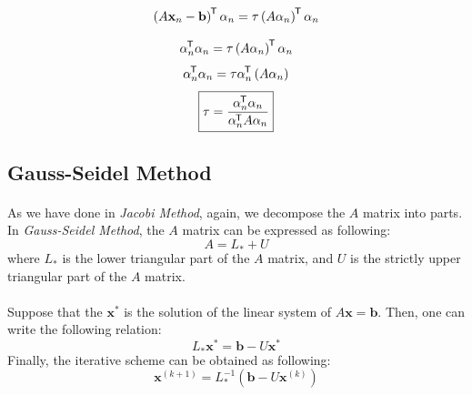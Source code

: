 \documentclass[letterpaper,12pt]{article}
\newcommand*{\tran}{^{\mkern-1.5mu\mathsf{T}}}
\begin{document}
\begin{equation*}
   \left( A \mathbf{x}_n - \mathbf{b} \right) \tran \mathbf{\alpha}_n = \tau \left( A \mathbf{\alpha}_n \right)\tran \mathbf{\alpha}_n 
\end{equation*}

\begin{equation*}
   \mathbf{\alpha}_n \tran \mathbf{\alpha}_n = \tau \left( A \mathbf{\alpha}_n \right)\tran \mathbf{\alpha}_n 
\end{equation*}
\begin{equation*}
   \mathbf{\alpha}_n \tran \mathbf{\alpha}_n = \tau \mathbf{\alpha}_n \tran \left( A \mathbf{\alpha}_n \right)
\end{equation*}
\begin{equation*}
   \boxed{\tau = \frac{ \mathbf{\alpha}_n \tran \mathbf{\alpha}_n}{\mathbf{\alpha}_n \tran  A \mathbf{\alpha}_n }}
\end{equation*}

\subsection{Gauss-Seidel Method}
   \paragraph{}As we have done in \textit{Jacobi Method}, again, we decompose the $A$ matrix into parts. In \textit{Gauss-Seidel Method}, the $A$ matrix can be expressed as following:
   \begin{equation*}
      A = L_* + U
   \end{equation*}
   where $L_*$ is the lower triangular part of the $A$ matrix, and $U$ is the strictly upper triangular part of the $A$ matrix.
   \paragraph{}Suppose that the $\mathbf{x}^*$ is the solution of the linear system of $A\mathbf{x} = \mathbf{b}$. Then, one can write the following relation:
   \begin{equation*}
      L_* \mathbf{x}^* = \mathbf{b} - U \mathbf{x}^*
   \end{equation*}
   Finally, the iterative scheme can be obtained as following:
   \begin{equation*}
      \mathbf{x}^{(k+1)}=  L_*^{-1} \left(\mathbf{b} - U \mathbf{x}^{(k)}\right) 
   \end{equation*}
\end{document}
